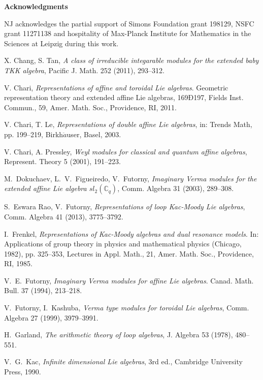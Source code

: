 \documentclass[11pt]{amsproc}
\theoremstyle{definition}
\theoremstyle{remark}
\numberwithin{equation}{section} \errorcontextlines=0
\begin{document}
\bigskip

\centerline{\bf Acknowledgments} NJ
acknowledges the partial support of Simons Foundation grant 198129,
NSFC grant 11271138 and hospitality of Max-Planck Institute for Mathematics
in the Sciences at Leipzig during this work.


\begin{thebibliography}{99}

 X. Chang, S. Tan, {\em A class of irreducible integarable modules for the extended baby TKK algebra},
Pacific J. Math. 252 (2011), 293--312.

 V. Chari, {\em Representations of affine and toroidal Lie algebras}. Geometric representation theory and extended affine Lie algebras, 169Ð197, Fields Inst. Commun., 59,
Amer. Math. Soc., Providence, RI, 2011.

 V. Chari, T. Le, {\em Representations of double affine Lie algebras}, in:
Trends Math, pp. 199--219, Birkh$\ddot{a}$user, Basel, 2003.

 V. Chari, A. Pressley, {\em Weyl modules for classical and quantum affine
algebras}, Represent. Theory 5 (2001), 191--223. 

 M.~Dokuchaev, L.~V.~Figueiredo, V.~Futorny, {\em Imaginary Verma modules for the extended affine Lie
algebra $sl_{2}(\mathbb{C}_{q})$}, Comm. Algebra 31 (2003), 289--308. 

 S.~Eswara Rao, V.~Futorny, {\em Representations of loop Kac-Moody Lie
algebras}, Comm. Algebra 41 (2013), 3775--3792. 

 I.~Frenkel, {\em Representations of Kac-Moody algebras and dual resonance models}.
In: Applications of group theory in physics and mathematical physics (Chicago, 1982), pp. 325--353,
Lectures in Appl. Math., 21, Amer. Math. Soc., Providence, RI, 1985.

 V.~E.~Futorny, {\em Imaginary Verma modules for affine Lie algebras}.
Canad. Math. Bull. 37 (1994), 213--218.

 V.~Futorny, I.~Kashuba, {\em Verma type
modules for toroidal Lie algebras}, Comm. Algebra 27 (1999),
3979--3991.

 H.~Garland, {\em The arithmetic theory of loop algebras}, J. Algebra
53 (1978), 480--551.

 V.~G.~Kac, {\em Infinite dimensional Lie algebras}, 3rd ed., Cambridge University Press, 1990.


\end{thebibliography}
\end{document}
